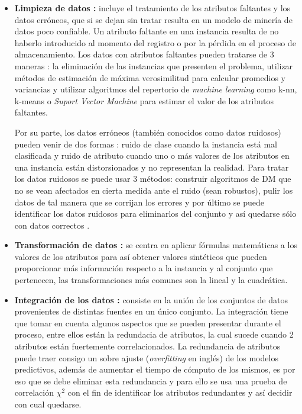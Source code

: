 \begin{itemize}
\item \textbf{Limpieza de datos \cite{garcia2016data, kim2003taxonomy}:}
incluye el tratamiento de los atributos faltantes y los datos erróneos, que si se dejan sin tratar resulta en un modelo de minería de datos poco confiable. Un atributo faltante en una instancia resulta de no haberlo introducido al momento del registro o por la pérdida en el proceso de almacenamiento. Los datos con atributos faltantes pueden tratarse de 3 maneras \cite{farhangfar2007novel}: la eliminación de las instancias que presenten el problema, utilizar métodos de estimación de máxima verosimilitud para calcular promedios y variancias y utilizar algoritmos del repertorio de \emph{machine learning} como k-nn, k-means o  \emph{Suport Vector Machine} para estimar el valor de los atributos faltantes. 

Por su parte, los datos erróneos (también conocidos como datos ruidosos) pueden venir de dos formas \cite{catal2011class}: ruido de clase cuando la instancia está mal clasificada y ruido de atributo cuando uno o más valores de los atributos en una instancia están distorsionados y no representan la realidad. Para tratar los datos ruidosos se puede usar 3 métodos: construir algoritmos de DM que no se vean afectados en cierta medida ante el ruido (sean robustos), pulir los datos \cite{teng1999correcting} de tal manera que se corrijan los errores y por último se puede identificar los datos ruidosos para eliminarlos del conjunto y así quedarse sólo con datos correctos \cite{brodley1999identifying}.

\item \textbf{Transformación de datos \cite{garcia2016data}:}
se centra en aplicar fórmulas matemáticas a los valores de los atributos para así obtener valores sintéticos que pueden proporcionar más información respecto a la instancia y al conjunto que pertenecen, las transformaciones más comunes son la lineal y la cuadrática.

\item \textbf{Integración de los datos \cite{garcia2016data,batini1986comparative}:}
consiste en la unión de los conjuntos de datos provenientes de distintas fuentes en un único conjunto. La integración tiene que tomar en cuenta algunos aspectos que se pueden presentar durante el proceso, entre ellos están la redundacia de atributos, la cual sucede cuando 2 atributos están fuertemente correlacionados. La redundancia de atributos puede traer consigo un sobre ajuste (\emph{overfitting} en inglés) de los modelos predictivos, además de aumentar el tiempo de cómputo de los mismos, es por eso que se debe eliminar esta redundancia y para ello se usa una prueba de correlación $\chi^2$ con el fin de identificar los atributos redundantes y así decidir con cual quedarse. 


\end{itemize}
